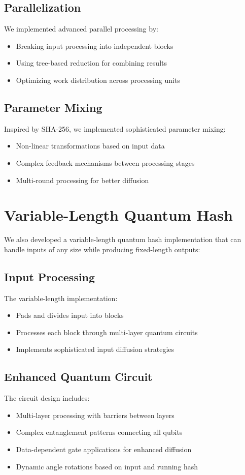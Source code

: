 \documentclass[conference]{IEEEtran}
\begin{document}
\subsection{Parallelization}
We implemented advanced parallel processing by:
\begin{itemize}
    \item Breaking input processing into independent blocks
    \item Using tree-based reduction for combining results
    \item Optimizing work distribution across processing units
\end{itemize}

\subsection{Parameter Mixing}
Inspired by SHA-256, we implemented sophisticated parameter mixing:
\begin{itemize}
    \item Non-linear transformations based on input data
    \item Complex feedback mechanisms between processing stages
    \item Multi-round processing for better diffusion
\end{itemize}

\section{Variable-Length Quantum Hash}
We also developed a variable-length quantum hash implementation that can handle inputs of any size while producing fixed-length outputs:

\subsection{Input Processing}
The variable-length implementation:
\begin{itemize}
    \item Pads and divides input into blocks
    \item Processes each block through multi-layer quantum circuits
    \item Implements sophisticated input diffusion strategies
\end{itemize}

\subsection{Enhanced Quantum Circuit}
The circuit design includes:
\begin{itemize}
    \item Multi-layer processing with barriers between layers
    \item Complex entanglement patterns connecting all qubits
    \item Data-dependent gate applications for enhanced diffusion
    \item Dynamic angle rotations based on input and running hash
\end{itemize}
\end{document}
